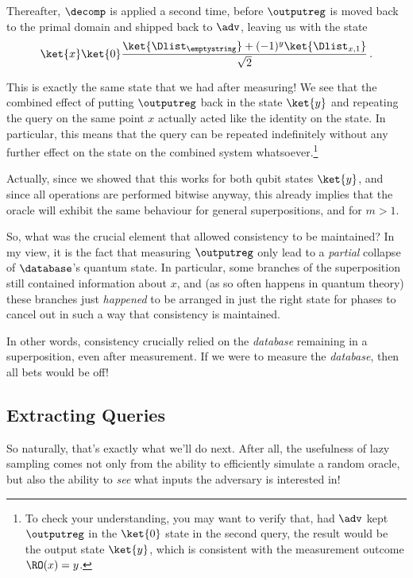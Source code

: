       \noindent
      Thereafter, $\decomp$ is applied a second time, before $\outputreg$ is
        moved back to the primal domain and shipped back to $\adv$, leaving us
        with the state
      \[
        \ket{x} \ket{0}
        \frac{
           \ket{\Dlist_{\emptystring}} + (-1)^y \ket{\Dlist_{x,1}}
         }{\sqrt{2}}\, .
      \]

      \noindent
      This is exactly the same state that we had after measuring! We see
        that the combined effect of putting $\outputreg$ back in the state
        $\ket{y}$ and repeating the query on the same point $x$ actually
        acted like the identity on the state. In particular, this means that
        the query can be repeated indefinitely without any further effect on
        the state on the combined system whatsoever.\footnote{
          To check your understanding, you may want to verify that,
          had $\adv$ kept $\outputreg$ in the $\ket{0}$ state in the second
          query, the result would be the output state $\ket{y}$, which is
          consistent with the measurement outcome $\RO(x) = y$.
        }

      Actually, since we showed that this works for both qubit states
        $\ket{y}$, and since all operations are performed bitwise
        anyway, this already implies that the oracle will exhibit the same
        behaviour for general superpositions, and for $m>1$.

      So, what was the crucial element that allowed consistency to be
        maintained? In my view, it is the fact that measuring $\outputreg$
        only lead to a \emph{partial} collapse of $\database$'s quantum
        state. In particular, some branches of the superposition still
        contained information about $x$, and (as so often happens in quantum
        theory) these branches just \emph{happened} to be
        arranged in just the right state for phases to cancel out 
        in such a way that consistency is maintained.

      In other words, consistency crucially relied on the \emph{database}
        remaining in a superposition, even after measurement. If we were to
        measure the \emph{database}, then all bets would be off!

    \subsection{Extracting Queries}\label{sec:extracting}
      So naturally, that's exactly what we'll do next. After all, the
        usefulness of lazy sampling comes not only from the ability to efficiently
        simulate a random oracle, but also the ability to \emph{see} what
        inputs the adversary is interested in!

